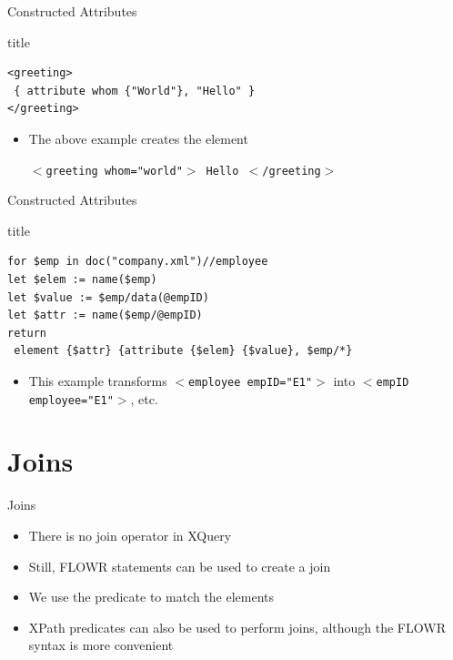 \documentclass[svgnames]{beamer}
\begin{document}
\begin{frame}[fragile]{Constructed Attributes}
\small
\begin{block}{title}
\begin{verbatim}
<greeting> 
 { attribute whom {"World"}, "Hello" }
</greeting>
\end{verbatim}
\end{block}
\normalsize
\begin{itemize}
	\item The above example creates the element \begin{center}\texttt{$<$greeting whom="world"$>$ Hello $<$/greeting$>$}\end{center}
\end{itemize}
\end{frame}

\begin{frame}[fragile]{Constructed Attributes}
\small
\begin{block}{title}
\begin{verbatim}
for $emp in doc("company.xml")//employee
let $elem := name($emp)
let $value := $emp/data(@empID)
let $attr := name($emp/@empID)
return 
 element {$attr} {attribute {$elem} {$value}, $emp/*}
\end{verbatim}
\end{block}
\normalsize
\begin{itemize}
	\item This example transforms \texttt{$<$employee empID="E1"$>$} into \texttt{$<$empID employee="E1"$>$}, etc.
\end{itemize}
\end{frame}

\section{Joins}

\begin{frame}[fragile]{Joins}
\begin{itemize}
	\item There is no join operator in XQuery
	\item Still, FLOWR statements can be used to create a join
	\item We use the predicate to match the elements
	\item XPath predicates can also be used to perform joins, although the FLOWR syntax is more convenient
\end{itemize}
\end{frame}
\end{document}
